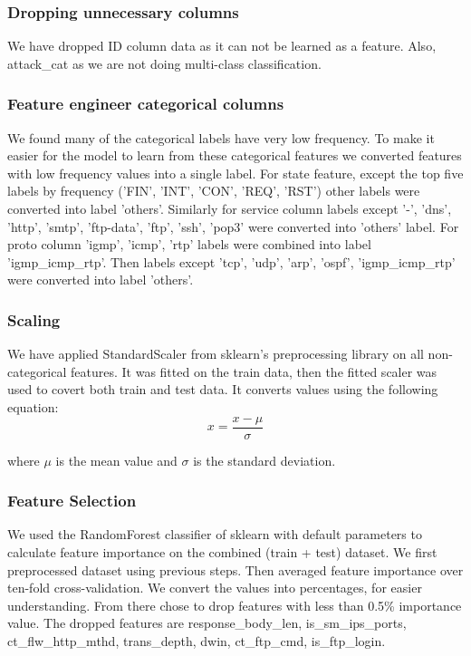 \documentclass[14pt, conference]{IEEEtran}
\begin{document}
\subsubsection{Dropping unnecessary columns}
We have dropped ID column data as it can not be learned as a feature. Also, attack\_cat as we are not doing multi-class classification.

\subsubsection{Feature engineer categorical columns}
We found many of the categorical labels have very low frequency. To make it easier for the model to learn from these categorical features we converted features with low frequency values into a single label. For state feature, except the top five labels by frequency ('FIN', 'INT', 'CON', 'REQ', 'RST') other labels were converted into label 'others'. Similarly for service column labels except '-', 'dns', 'http', 'smtp', 'ftp-data', 'ftp', 'ssh', 'pop3' were converted into 'others' label. For proto column 'igmp', 'icmp', 'rtp' labels were combined into label 'igmp\_icmp\_rtp'. Then labels except 'tcp', 'udp', 'arp', 'ospf', 'igmp\_icmp\_rtp' were converted into label 'others'. 


\subsubsection{Scaling}
We have applied StandardScaler from sklearn's preprocessing library on all non-categorical features. It was fitted on the train data, then the fitted scaler was used to covert both train and test data. It converts values using the following equation: 
\begin{equation}
    x = \frac{x-\mu}{\sigma}
\end{equation}

where $\mu$ is the mean value and $\sigma$ is the standard deviation. 

\subsubsection{Feature Selection}
We used the RandomForest classifier of sklearn with default parameters to calculate feature importance on the combined (train + test) dataset. We first preprocessed dataset using previous steps. Then averaged feature importance over ten-fold cross-validation. We convert the values into percentages, for easier understanding. From there chose to drop features with less than 0.5\% importance value. The dropped features are response\_body\_len, is\_sm\_ips\_ports, ct\_flw\_http\_mthd, trans\_depth, dwin, ct\_ftp\_cmd, is\_ftp\_login.
\end{document}

